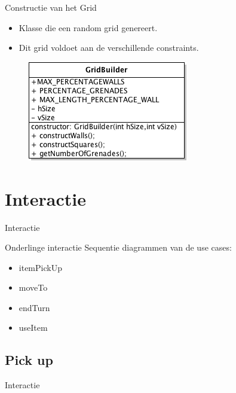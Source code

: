 \documentclass[t]{beamer}
\begin{document}
\begin{frame}{Constructie van het Grid}
\begin{itemize}
	\item Klasse die een random grid genereert.
	\item Dit grid voldoet aan de verschillende constraints.
\end{itemize}

\begin{figure}
\begin{center}
\includegraphics[scale=0.5]{../uml/gridBuilder.png}
\end{center}
\end{figure}

\end{frame}

\section{Interactie}
\begin{frame}{Interactie}
\begin{multicols}{2}
\tableofcontents[currentsection]
\end{multicols}
\end{frame}

\begin{frame}{Onderlinge interactie}
Sequentie diagrammen van de use cases:
\begin{itemize}
	\item itemPickUp
	\item moveTo
	\item endTurn
	\item useItem
\end{itemize}
\end{frame}

\subsection{Pick up}
\begin{frame}{Interactie}
\begin{multicols}{2}
\tableofcontents[currentsection]
\end{multicols}
\end{frame}
\end{document}
